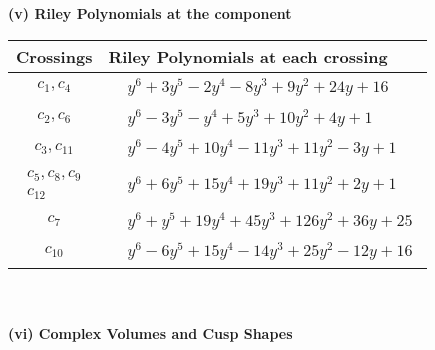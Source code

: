 \documentclass[1p]{elsarticle_modified}
\theoremstyle{definition}
\begin{document}
\newpage\renewcommand{\arraystretch}{1}
\flushleft \textbf{(v) Riley Polynomials at the component}\newline \\
\begin{tabular}{m{50pt}|m{274pt}}
Crossings & \hspace{64pt}Riley Polynomials at each crossing \\
\hline $$\begin{aligned}c_{1},c_{4}\end{aligned}$$&$\begin{aligned}
&y^6+3 y^5-2 y^4-8 y^3+9 y^2+24 y+16
\end{aligned}$\\
\hline $$\begin{aligned}c_{2},c_{6}\end{aligned}$$&$\begin{aligned}
&y^6-3 y^5- y^4+5 y^3+10 y^2+4 y+1
\end{aligned}$\\
\hline $$\begin{aligned}c_{3},c_{11}\end{aligned}$$&$\begin{aligned}
&y^6-4 y^5+10 y^4-11 y^3+11 y^2-3 y+1
\end{aligned}$\\
\hline $$\begin{aligned}c_{5},c_{8},c_{9}\\c_{12}\end{aligned}$$&$\begin{aligned}
&y^6+6 y^5+15 y^4+19 y^3+11 y^2+2 y+1
\end{aligned}$\\
\hline $$\begin{aligned}c_{7}\end{aligned}$$&$\begin{aligned}
&y^6+y^5+19 y^4+45 y^3+126 y^2+36 y+25
\end{aligned}$\\
\hline $$\begin{aligned}c_{10}\end{aligned}$$&$\begin{aligned}
&y^6-6 y^5+15 y^4-14 y^3+25 y^2-12 y+16
\end{aligned}$\\
\hline
\end{tabular}\\~\\
\newpage\flushleft \textbf{(vi) Complex Volumes and Cusp Shapes}
\end{document}
